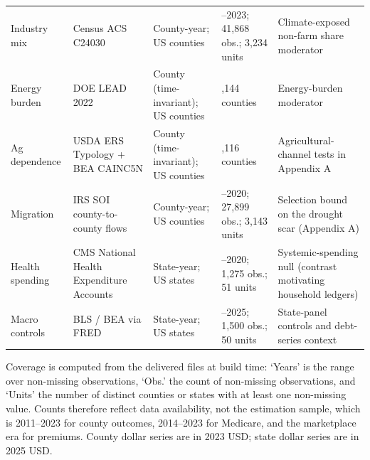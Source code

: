 \begin{longtable}{>{\raggedright\arraybackslash}p{1.8cm} >{\raggedright\arraybackslash}p{4.30cm} >{\raggedright\arraybackslash}p{2.9cm} >{\raggedright\arraybackslash}p{2.9cm} >{\raggedright\arraybackslash}p{3.1cm}}
Industry mix & Census ACS C24030 & County-year; US counties & 2011--2023; 41,868 obs.; 3,234 units & Climate-exposed non-farm share moderator \\
Energy burden & DOE LEAD 2022 & County (time-invariant); US counties & 3,144 counties & Energy-burden moderator \\
Ag dependence & USDA ERS Typology + BEA CAINC5N & County (time-invariant); US counties & 3,116 counties & Agricultural-channel tests in Appendix A \\
Migration & IRS SOI county-to-county flows & County-year; US counties & 2012--2020; 27,899 obs.; 3,143 units & Selection bound on the drought scar (Appendix A) \\
Health spending & CMS National Health Expenditure Accounts & State-year; US states & 1996--2020; 1,275 obs.; 51 units & Systemic-spending null (contrast motivating household ledgers) \\
Macro controls & BLS / BEA via FRED & State-year; US states & 1996--2025; 1,500 obs.; 50 units & State-panel controls and debt-series context \\
\end{longtable}
\vspace{-0.6em}\begin{minipage}{\textwidth}\footnotesize
Coverage is computed from the delivered files at build time: `Years' is the range over non-missing observations, `Obs.' the count of non-missing observations, and `Units' the number of distinct counties or states with at least one non-missing value. Counts therefore reflect data availability, not the estimation sample, which is 2011--2023 for county outcomes, 2014--2023 for Medicare, and the marketplace era for premiums. County dollar series are in 2023 USD; state dollar series are in 2025 USD.
\end{minipage}
\endgroup
